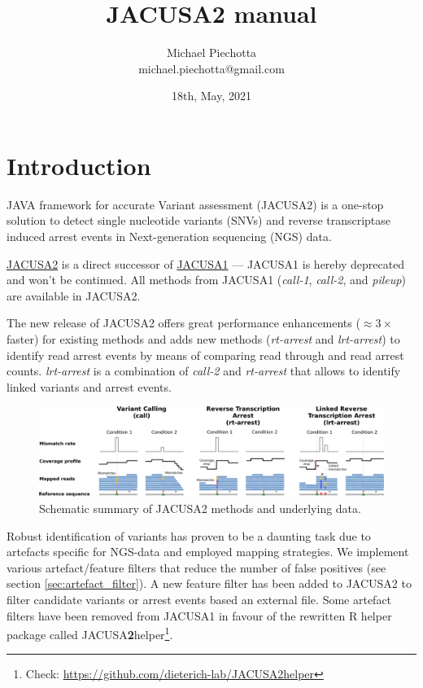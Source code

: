 \documentclass[10pt,a4paper,final]{article}
\title{JACUSA2 manual}
\author{Michael Piechotta \\ michael.piechotta@gmail.com}
\date{18th, May, 2021}
\begin{document}
\newcommand{\call}[1]{\textit{call-#1}\xspace}
\newcommand{\pileup}{\textit{pileup}\xspace}
\newcommand{\rtarrest}{\textit{rt-arrest}\xspace}
\newcommand{\lrtarrest}{\textit{lrt-arrest}\xspace}
\maketitle
\tableofcontents
\listoftodos
\newpage
\section{Introduction}
JAVA framework for accurate Variant assessment (JACUSA2) is a one-stop solution to detect single
nucleotide variants (SNVs) and reverse transcriptase induced arrest events in Next-generation
sequencing (NGS) data.

\href{https://github.com/dieterich-lab/JACUSA2/}{JACUSA2} is a direct successor of 
\href{https://github.com/dieterich-lab/JACUSA/}{JACUSA1} --- JACUSA1 is hereby deprecated and won't be 
continued. All methods from JACUSA1 (\call{1}, \call{2}, and \pileup) are available in JACUSA2.

The new release of JACUSA2 offers great performance enhancements ($\approx3\times$ faster) for existing methods
and adds new methods (\rtarrest and \lrtarrest) to identify read arrest events by means of comparing 
read through and read arrest counts. \lrtarrest is a combination of \call{2} and \rtarrest that 
allows to identify linked variants and arrest events.

\begin{figure}[ht]
  \centering
  \includegraphics[width=\textwidth]{figures/jacusa_methods_cropped}
  \caption{Schematic summary of JACUSA2 methods and underlying data.}
  \label{fig:methods}
\end{figure}

Robust identification of variants has proven to be a daunting task due to artefacts specific for
NGS-data and employed mapping strategies. We implement various artefact/feature filters that reduce
the number of false positives (see section \ref{sec:artefact_filter}). A new feature filter has been
added to JACUSA2 to filter candidate variants or arrest events based an external file.
Some artefact filters have been removed from JACUSA1 in favour of the rewritten R helper package called 
JACUSA\textbf{2}helper\footnote{Check: \url{https://github.com/dieterich-lab/JACUSA2helper}}.
\end{document}
